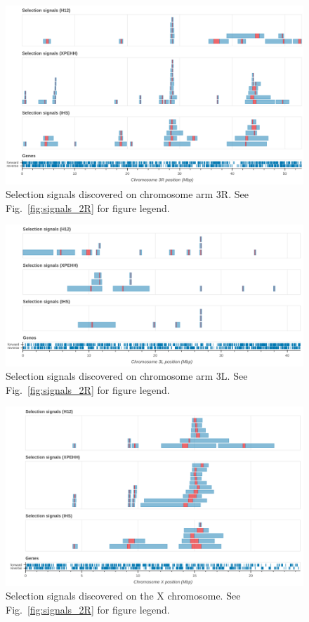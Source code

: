 \begin{refsection}
\clearpage
\begin{figure}[h!]
\centering
\includegraphics[width=1.1\textwidth,center]{artwork/chapter5/signals_3R.png}
\caption{Selection signals discovered on chromosome arm 3R.
%
See Fig.~\ref{fig:signals_2R} for figure legend.
}
\label{fig:signals_3R}
\end{figure}


\clearpage
\begin{figure}[h!]
\centering
\includegraphics[width=1.1\textwidth,center]{artwork/chapter5/signals_3L.png}
\caption{Selection signals discovered on chromosome arm 3L.
%
See Fig.~\ref{fig:signals_2R} for figure legend.
}
\label{fig:signals_3L}
\end{figure}


\clearpage
\begin{figure}[h!]
\centering
\includegraphics[width=1.1\textwidth,center]{artwork/chapter5/signals_X.png}
\caption{Selection signals discovered on the X chromosome.
%
See Fig.~\ref{fig:signals_2R} for figure legend.
}
\label{fig:signals_X}
\end{figure}



\end{refsection}

